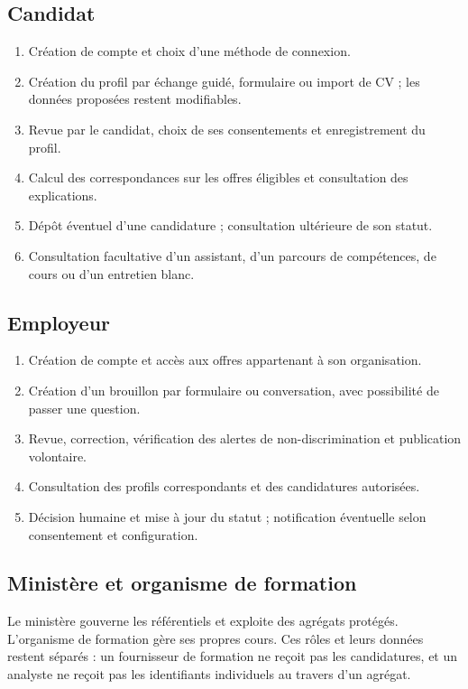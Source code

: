 \documentclass[11pt,a4paper]{article}
\begin{document}
\subsection{Candidat}
\begin{enumerate}
  \item Création de compte et choix d'une méthode de connexion.
  \item Création du profil par échange guidé, formulaire ou import de CV ; les données proposées restent modifiables.
  \item Revue par le candidat, choix de ses consentements et enregistrement du profil.
  \item Calcul des correspondances sur les offres éligibles et consultation des explications.
  \item Dépôt éventuel d'une candidature ; consultation ultérieure de son statut.
  \item Consultation facultative d'un assistant, d'un parcours de compétences, de cours ou d'un entretien blanc.
\end{enumerate}

\subsection{Employeur}
\begin{enumerate}
  \item Création de compte et accès aux offres appartenant à son organisation.
  \item Création d'un brouillon par formulaire ou conversation, avec possibilité de passer une question.
  \item Revue, correction, vérification des alertes de non-discrimination et publication volontaire.
  \item Consultation des profils correspondants et des candidatures autorisées.
  \item Décision humaine et mise à jour du statut ; notification éventuelle selon consentement et configuration.
\end{enumerate}

\subsection{Ministère et organisme de formation}

Le ministère gouverne les référentiels et exploite des agrégats protégés. L'organisme de formation gère ses propres cours. Ces rôles et leurs données restent séparés : un fournisseur de formation ne reçoit pas les candidatures, et un analyste ne reçoit pas les identifiants individuels au travers d'un agrégat.
\end{document}
